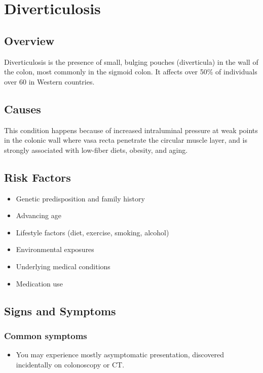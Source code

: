 \chapter{Diverticulosis}
\label{sec:Diverticulosis}

\section{Overview}
Diverticulosis is the presence of small, bulging pouches (diverticula) in the wall of the colon, most commonly in the sigmoid colon. It affects over 50\% of individuals over 60 in Western countries.
\section{Causes}
This condition happens because of increased intraluminal pressure at weak points in the colonic wall where vasa recta penetrate the circular muscle layer, and is strongly associated with low-fiber diets, obesity, and aging.     
\section{Risk Factors}

\begin{itemize}[noitemsep]
  \item Genetic predisposition and family history
  \item Advancing age
  \item Lifestyle factors (diet, exercise, smoking, alcohol)
  \item Environmental exposures
  \item Underlying medical conditions
  \item Medication use
\end{itemize}
\section{Signs and Symptoms}

\subsection{Common symptoms}
\begin{itemize}[noitemsep]
  \item You may experience mostly asymptomatic presentation, discovered incidentally on colonoscopy or CT. 
  \end{itemize}

